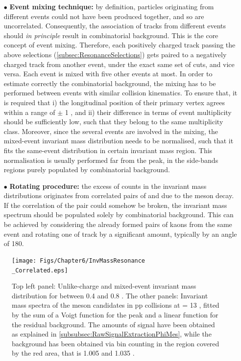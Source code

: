 \begin{itemize}
\item[$\bullet$] \textbf{Event mixing technique:} by definition, particles originating from different events could not have been produced together, and so are uncorrelated. Consequently, the association of tracks from different events should \textit{in principle} result in combinatorial background. This is the core concept of event mixing.
Therefore, each positively charged track passing the above selections (\Sec\ref{subsec:ResonanceSelections}) gets paired to a negatively charged track from another event, under the exact same set of cuts, and vice versa. Each event is mixed with five other events at most.
In order to estimate correctly the combinatorial background, the mixing has to be performed between events with similar collision kinematics. To ensure that, it is required that i) the longitudinal position of their primary vertex agrees within a range of $\pm$ 1 \cm, and ii) their difference in terms of event multiplicity should be sufficiently low, such that they belong to the same multiplicity class. Moreover, since the several events are involved in the mixing, the mixed-event invariant mass distribution needs to be normalised, such that it fits the same-event distribution in certain invariant mass region. This normalisation is usually performed far from the peak, in the side-bands regions purely populated by combinatorial background.
\item[$\bullet$] \textbf{Rotating procedure:} the excess of counts in the invariant mass distributions originates from correlated pairs of \rmKplus and \rmKminus due to the \rmPhiMes meson decay. If the correlation of the pair could somehow be broken, the invariant mass spectrum should be populated solely by combinatorial background. This can be achieved by considering the already formed pairs of kaons from the same event and rotating one of track by a significant amount, typically by an angle of 180\textdegree. 
\end{itemize}

\begin{figure}[t]
	\hspace{-2.cm}
	\texttt{[image: Figs/Chapter6/InvMassResonance\\\_Correlated.eps]}
\caption{Top left panel: Unlike-charge and mixed-event invariant mass distribution for \pT between 0.4 and 0.8 \gmom. The other panels: Invariant mass spectra of the \rmPhiMes meson candidates in pp collisions at \sqrtS = 13 \tev, fitted by the sum of a Voigt function for the peak and a linear function for the residual background. The amounts of signal have been obtained as explained in \Sec\ref{subsubsec:RawSignalExtractionPhiMes}, while the background has been obtained via bin counting in the region covered by the red area, that is 1.005 and 1.035 \gmass.}
	\label{fig:InvMassPhiResVsPt}
\end{figure}

